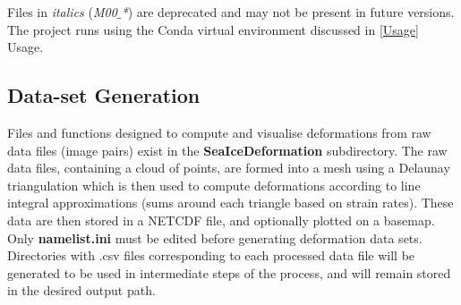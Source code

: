 \documentclass{article}
\begin{document}
    \begin{figure}[H]
        \centering
        \begin{minipage}[b]{.5\textwidth}
        \end{minipage}%
        \begin{minipage}{.5\textwidth}
        \end{minipage}
    \end{figure}

    Files in \textit{italics} (\textit{M00$\_$*}) are deprecated and may not be present in future versions. The project runs using the Conda virtual environment discussed in \ref{Usage} Usage.

    \subsection{Data-set Generation}

    Files and functions designed to compute and visualise deformations from raw data files (image pairs) exist in the \textbf{SeaIceDeformation} subdirectory. The raw data files, containing a cloud of points, are formed into a mesh using a Delaunay triangulation which is then used to compute deformations according to line integral approximations (sums around each triangle based on strain rates). These data are then stored in a NETCDF file, and optionally plotted on a basemap. Only \textbf{namelist.ini} must be edited before generating deformation data sets. Directories with .csv files corresponding to each processed data file will be generated to be used in intermediate steps of the process, and will remain stored in the desired output path.
\end{document}
